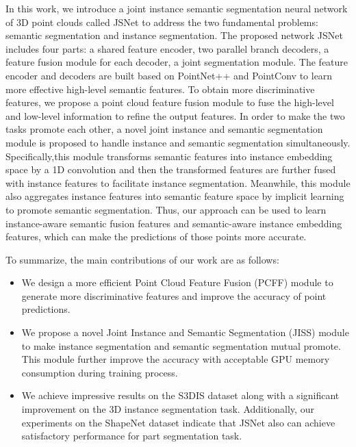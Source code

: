 \documentclass[letterpaper]{article} \usepackage{aaai20}  \usepackage{times}  \usepackage{helvet} \usepackage{courier}  \usepackage[hyphens]{url}  \usepackage{graphicx} \urlstyle{rm} \def\UrlFont{\rm}  \usepackage{graphicx}  \frenchspacing  \setlength{\pdfpagewidth}{8.5in}  \setlength{\pdfpageheight}{11in}
\begin{document}
In this work, we introduce a joint instance semantic segmentation neural network of 3D point clouds called JSNet to address the two fundamental problems: semantic segmentation and instance segmentation. The proposed network JSNet includes four parts: a shared feature encoder, two parallel branch decoders, a feature fusion module for each decoder, a joint segmentation module. The feature encoder and decoders are built based on PointNet++ \cite{qi2017pointnet++} and PointConv \cite{wu2018pointconv} to learn more effective high-level semantic features. To obtain more discriminative features, we propose a point cloud feature fusion module to fuse the high-level and low-level information to refine the output features. In order to make the two tasks promote each other, a novel joint instance and semantic segmentation module is proposed to handle instance and semantic segmentation simultaneously. Specifically,this module transforms semantic features into instance embedding space by a 1D convolution and then the transformed features are further fused with instance features to facilitate instance segmentation. Meanwhile, this module also aggregates instance features into semantic feature space by implicit learning to promote semantic segmentation. Thus, our approach can be used to learn instance-aware semantic fusion features and semantic-aware instance embedding features, which can make the predictions of those points more accurate.

To summarize, the main contributions of our work are as follows:

\begin{itemize}
\item We design a more efficient Point Cloud Feature Fusion (PCFF) module to generate more discriminative features and improve the accuracy of point predictions.
\item We propose a novel Joint Instance and Semantic Segmentation (JISS) module to make instance segmentation and semantic segmentation mutual promote. This module further improve the accuracy with acceptable GPU memory consumption during training process.
\item We achieve impressive results on the S3DIS dataset \cite{Armeni_2016_CVPR} along with a significant improvement on the 3D instance segmentation task. Additionally, our experiments on the ShapeNet dataset \cite{yi2016scalable} indicate that JSNet also can achieve satisfactory performance for part segmentation task.
\end{itemize}
\end{document}

